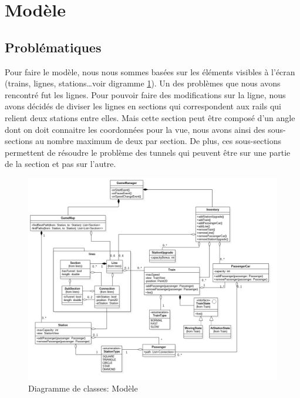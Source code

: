 \documentclass[report, backcover, french, nodocumentinfo]{upmethodology-document}
\begin{document}
		\section{Modèle}
			\subsection{Problématiques}
				\p{}
					Pour faire le modèle, nous nous sommes basées sur les éléments visibles à l'écran (trains, lignes, stations\ldots voir digramme \ref{fig:ModelClassDiagram}). Un des problèmes que nous avons rencontré fut les lignes. Pour pouvoir faire des modifications sur la ligne, nous avons décidés de diviser les lignes en sections qui correspondent aux rails qui relient deux stations entre elles. Mais cette section peut être composé d'un angle dont on doit connaitre les coordonnées pour la vue, nous avons ainsi des sous-sections au nombre maximum de deux par section. De plus, ces sous-sections permettent de résoudre le problème des tunnels qui peuvent être sur une partie de la section et pas sur l'autre.
					\begin{figure}[h!]
						\centering
						\includegraphics[width=1\textwidth]{figures/ModelClassDiagram}
						\caption{Diagramme de classes: Modèle}
						\label{fig:ModelClassDiagram}
					\end{figure}
\end{document}
